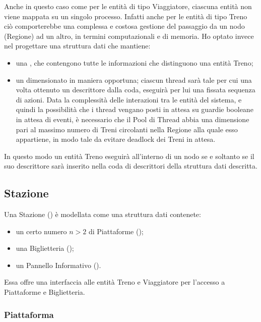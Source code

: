 	Anche in questo caso come per le entità di tipo Viaggiatore, ciascuna entità non viene mappata su un singolo processo. Infatti anche per le entità di tipo Treno ciò comporterebbe una complessa e costosa gestione del passaggio da un nodo (Regione) ad un altro, in termini computazionali e di memoria. 
	Ho optato invece nel progettare una struttura dati  che mantiene:
		\begin{itemize}
			\item una , che contengono tutte le informazioni che distinguono una entità Treno;
			\item un  dimensionato in maniera opportuna; ciascun thread sarà tale per cui una volta ottenuto un descrittore dalla coda, eseguirà per lui una fissata sequenza di azioni. Data la complessità delle interazioni tra le entità del sistema, e quindi la possibilità che i thread vengano posti in attesa su guardie booleane in attesa di eventi, è necessario che il Pool di Thread abbia una dimensione pari al massimo numero di Treni circolanti nella Regione alla quale esso appartiene, in modo tale da evitare deadlock dei Treni in attesa. 
		\end{itemize}
	In questo modo un entità Treno eseguirà all'interno di un nodo se e soltanto se il suo descrittore sarà inserito nella coda di descrittori della struttura dati descritta. 
				
	\subsection{Stazione} \label{subsec:station}
	
	Una Stazione () è modellata come una struttura dati contenete:
		\begin{itemize}
			\item un certo numero $ n > 2$ di Piattaforme ();
			\item una Biglietteria ();
			\item un Pannello Informativo ().
		\end{itemize}
	Essa offre una interfaccia alle entità Treno e Viaggiatore per l'accesso a Piattaforme e Biglietteria.
		
		\subsubsection{Piattaforma}
	
